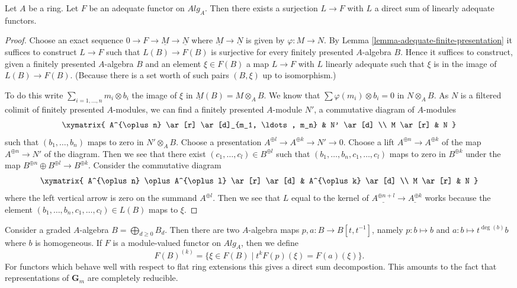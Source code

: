 \begin{lemma}
\label{lemma-adequate-surjection-from-linear}
Let $A$ be a ring.
Let $F$ be an adequate functor on $\textit{Alg}_A$. Then there exists a
surjection $L \to F$ with $L$ a direct sum of linearly adequate functors.
\end{lemma}

\begin{proof}
Choose an exact sequence $0 \to F \to \underline{M} \to \underline{N}$
where $\underline{M} \to \underline{N}$ is given by
$\varphi : M \to N$. By
Lemma \ref{lemma-adequate-finite-presentation}
it suffices to construct $L \to F$ such that $L(B) \to F(B)$ is surjective
for every finitely presented $A$-algebra $B$. Hence it suffices to construct,
given a finitely presented $A$-algebra $B$ and an element $\xi \in F(B)$
a map $L \to F$ with $L$ linearly adequate such that $\xi$ is in the image
of $L(B) \to F(B)$.
(Because there is a set worth of such pairs $(B, \xi)$ up to isomorphism.)

\medskip\noindent
To do this write $\sum_{i = 1, \ldots, n} m_i \otimes b_i$ the image of
$\xi$ in $\underline{M}(B) = M \otimes_A B$. We know that
$\sum \varphi(m_i) \otimes b_i = 0$ in $N \otimes_A B$.
As $N$ is a filtered colimit of finitely presented $A$-modules, we can
find a finitely presented $A$-module $N'$, a commutative diagram
of $A$-modules
$$
\xymatrix{
A^{\oplus n} \ar[r] \ar[d]_{m_1, \ldots, m_n} & N' \ar[d] \\
M \ar[r] & N
}
$$
such that $(b_1, \ldots, b_n)$ maps to zero in $N' \otimes_A B$.
Choose a presentation $A^{\oplus l} \to A^{\oplus k} \to N' \to 0$.
Choose a lift $A^{\oplus n} \to A^{\oplus k}$ of the map
$A^{\oplus n} \to N'$ of the diagram. Then we see that there exist
$(c_1, \ldots, c_l) \in B^{\oplus l}$ such that
$(b_1, \ldots, b_n, c_1, \ldots, c_l)$ maps to zero in $B^{\oplus k}$
under the map $B^{\oplus n} \oplus B^{\oplus l} \to B^{\oplus k}$.
Consider the commutative diagram
$$
\xymatrix{
A^{\oplus n} \oplus A^{\oplus l} \ar[r] \ar[d] & A^{\oplus k} \ar[d] \\
M \ar[r] & N
}
$$
where the left vertical arrow is zero on the summand $A^{\oplus l}$.
Then we see that $L$ equal to the kernel of $\underline{A^{\oplus n + l}}
\to \underline{A^{\oplus k}}$ works because the element
$(b_1, \ldots, b_n, c_1, \ldots, c_l) \in L(B)$ maps to $\xi$.
\end{proof}

\noindent
Consider a graded $A$-algebra $B = \bigoplus_{d \geq 0} B_d$. Then there are
two $A$-algebra maps $p, a : B \to B[t, t^{-1}]$, namely $p : b \mapsto b$ and
$a : b \mapsto t^{\deg(b)} b$ where $b$ is homogeneous. If $F$ is a
module-valued functor on $\textit{Alg}_A$, then we define
\begin{equation}
\label{equation-weight-k}
F(B)^{(k)} = \{\xi \in F(B) \mid t^k F(p)(\xi) = F(a)(\xi)\}.
\end{equation}
For functors which behave well with respect to flat ring extensions
this gives a direct sum decompostion. This amounts to the fact that
representations of $\mathbf{G}_m$ are completely reducible.

